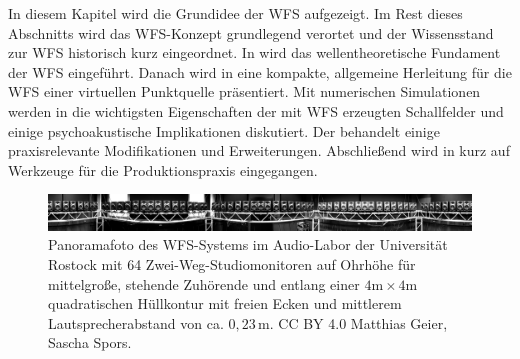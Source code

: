 In diesem Kapitel wird die Grundidee der WFS aufgezeigt.
%
Im Rest dieses Abschnitts wird das WFS-Konzept grundlegend verortet
und der Wissensstand zur WFS historisch kurz eingeordnet.
%
In  wird das wellentheoretische Fundament der WFS eingeführt.
%
Danach wird in  eine kompakte, allgemeine Herleitung
für die WFS einer virtuellen Punktquelle präsentiert.
%
Mit numerischen Simulationen werden in 
die wichtigsten Eigenschaften der mit WFS
erzeugten Schallfelder und einige psychoakustische Implikationen diskutiert.
%
Der  behandelt einige praxisrelevante
Modifikationen und Erweiterungen.
%
Abschließend wird in  kurz auf Werkzeuge für die
Produktionspraxis eingegangen.
%
\begin{figure}
\centering
\begin{plotfigures}
\includegraphics[width=174mm]{../fotos/WFS_Array_UniRostockH8_2014.jpg}
\end{plotfigures}
\caption{Panoramafoto des WFS-Systems im Audio-Labor der Universität Rostock mit
64 Zwei-Weg-Studiomonitoren auf Ohrhöhe für mittelgroße, stehende Zuhörende und
entlang einer $4 \text{m} \times 4 \text{m}$ quadratischen Hüllkontur mit freien
Ecken und mittlerem Lautsprecherabstand von ca. $0{,}23$\,m.
%
CC BY 4.0 Matthias Geier, Sascha Spors.
}
\label{fig:WFS_Array_Haus8}
\end{figure}



